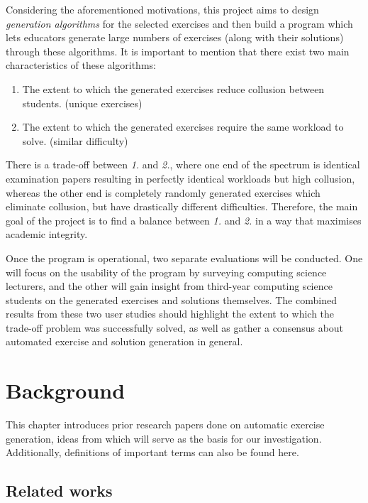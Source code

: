 \documentclass{l4proj}
\begin{document}
Considering the aforementioned motivations, this project aims to design \emph{generation algorithms} for the selected exercises and then build a program which lets educators generate large numbers of exercises (along with their solutions) through these algorithms. It is important to mention that there exist two main characteristics of these algorithms:
\begin{enumerate}
	\item
	The extent to which the generated exercises reduce collusion between students. (unique exercises)
	\item
	The extent to which the generated exercises require the same workload to solve. (similar difficulty)
\end{enumerate}
There is a trade-off between \emph{1.} and \emph{2.}, where one end of the spectrum is identical examination papers resulting in perfectly identical workloads but high collusion, whereas the other end is completely randomly generated exercises which eliminate collusion, but have drastically different difficulties. Therefore, the main goal of the project is to find a balance between \emph{1.} and \emph{2.} in a way that maximises academic integrity.

Once the program is operational, two separate evaluations will be conducted. One will focus on the usability of the program by surveying computing science lecturers, and the other will gain insight from third-year computing science students on the generated exercises and solutions themselves. The combined results from these two user studies should highlight the extent to which the trade-off problem was successfully solved, as well as gather a consensus about automated exercise and solution generation in general.

\chapter{Background}
\label{chap:back}

This chapter introduces prior research papers done on automatic exercise generation, ideas from which will serve as the basis for our investigation. Additionally, definitions of important terms can also be found here.

\section{Related works}
\end{document}
